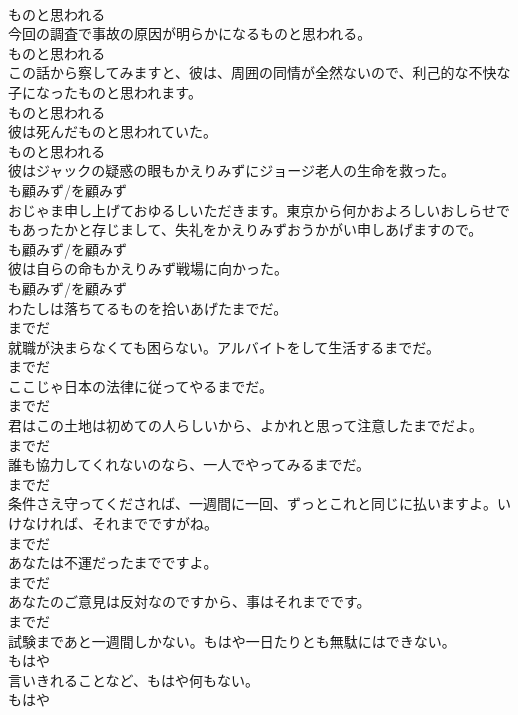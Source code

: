 \documentclass[8pt]{extreport}
\begin{document}
\begin{CJK}{UTF8}{min}
\\	ものと思われる
\\	今回の調査で事故の原因が明らかになるものと思われる。	
\\	ものと思われる
\\	この話から察してみますと、彼は、周囲の同情が全然ないので、利己的な不快な子になったものと思われます。	
\\	ものと思われる
\\	彼は死んだものと思われていた。	
\\	ものと思われる
\\	彼はジャックの疑惑の眼もかえりみずにジョージ老人の生命を救った。	
\\	も顧みず/を顧みず
\\	おじゃま申し上げておゆるしいただきます。東京から何かおよろしいおしらせでもあったかと存じまして、失礼をかえりみずおうかがい申しあげますので。	
\\	も顧みず/を顧みず
\\	彼は自らの命もかえりみず戦場に向かった。	
\\	も顧みず/を顧みず
\\	わたしは落ちてるものを拾いあげたまでだ。	
\\	までだ
\\	就職が決まらなくても困らない。アルバイトをして生活するまでだ。	
\\	までだ
\\	ここじゃ日本の法律に従ってやるまでだ。	
\\	までだ
\\	君はこの土地は初めての人らしいから、よかれと思って注意したまでだよ。	
\\	までだ
\\	誰も協力してくれないのなら、一人でやってみるまでだ。	
\\	までだ
\\	条件さえ守ってくだされば、一週間に一回、ずっとこれと同じに払いますよ。いけなければ、それまでですがね。	
\\	までだ
\\	あなたは不運だったまでですよ。	
\\	までだ
\\	あなたのご意見は反対なのですから、事はそれまでです。	
\\	までだ
\\	試験まであと一週間しかない。もはや一日たりとも無駄にはできない。	
\\	もはや
\\	言いきれることなど、もはや何もない。	
\\	もはや

\end{CJK}
\end{document}
